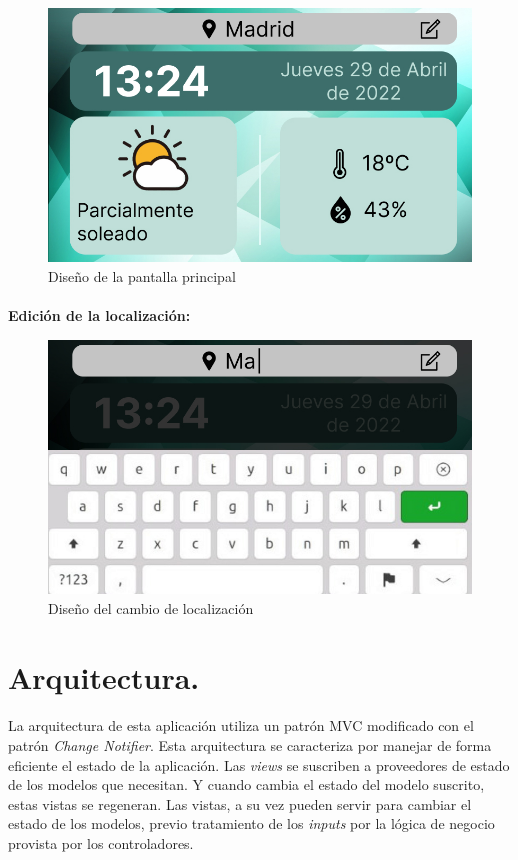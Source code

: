 \begin{figure}[H]
	\centering
	\includegraphics[width=0.75\linewidth]{imgs/figma-main}
	\caption[Diseño de la pantalla principal]{Diseño de la pantalla principal}
	\label{fig:design_main_screen}
\end{figure}

\paragraph{}\textbf{Edición de la localización:}

\begin{figure}[H]
	\centering
	\includegraphics[width=0.75\linewidth]{imgs/figma-location}
	\caption[Diseño del cambio de localización]{Diseño del cambio de localización}
	\label{fig:design_location}
\end{figure}

\section{Arquitectura.}

\paragraph{}La arquitectura de esta aplicación utiliza un patrón MVC modificado con el
patrón \emph{Change Notifier}. Esta arquitectura se caracteriza por manejar de forma
eficiente el estado de la aplicación. Las \emph{views} se suscriben a proveedores de
estado de los modelos que necesitan. Y cuando cambia el estado del modelo suscrito,
estas vistas se regeneran. Las vistas, a su vez pueden servir para cambiar el estado
de los modelos, previo tratamiento de los \emph{inputs} por la lógica de negocio provista
por los controladores.

